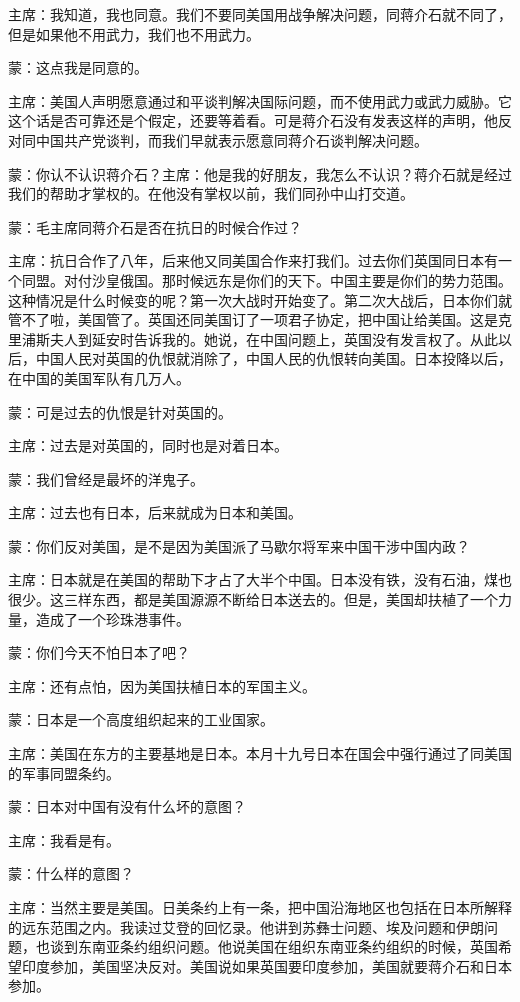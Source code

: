 主席：我知道，我也同意。我们不要同美国用战争解决问题，同蒋介石就不同了，但是如果他不用武力，我们也不用武力。

蒙：这点我是同意的。

主席：美国人声明愿意通过和平谈判解决国际问题，而不使用武力或武力威胁。它这个话是否可靠还是个假定，还要等着看。可是蒋介石没有发表这样的声明，他反对同中国共产党谈判，而我们早就表示愿意同蒋介石谈判解决问题。

蒙：你认不认识蒋介石？主席：他是我的好朋友，我怎么不认识？蒋介石就是经过我们的帮助才掌权的。在他没有掌权以前，我们同孙中山打交道。

蒙：毛主席同蒋介石是否在抗日的时候合作过？

主席：抗日合作了八年，后来他又同美国合作来打我们。过去你们英国同日本有一个同盟。对付沙皇俄国。那时候远东是你们的天下。中国主要是你们的势力范围。这种情况是什么时候变的呢？第一次大战时开始变了。第二次大战后，日本你们就管不了啦，美国管了。英国还同美国订了一项君子协定，把中国让给美国。这是克里浦斯夫人到延安时告诉我的。她说，在中国问题上，英国没有发言权了。从此以后，中国人民对英国的仇恨就消除了，中国人民的仇恨转向美国。日本投降以后，在中国的美国军队有几万人。

蒙：可是过去的仇恨是针对英国的。

主席：过去是对英国的，同时也是对着日本。

蒙：我们曾经是最坏的洋鬼子。

主席：过去也有日本，后来就成为日本和美国。

蒙：你们反对美国，是不是因为美国派了马歇尔将军来中国干涉中国内政？

主席：日本就是在美国的帮助下才占了大半个中国。日本没有铁，没有石油，煤也很少。这三样东西，都是美国源源不断给日本送去的。但是，美国却扶植了一个力量，造成了一个珍珠港事件。

蒙：你们今天不怕日本了吧？

主席：还有点怕，因为美国扶植日本的军国主义。

蒙：日本是一个高度组织起来的工业国家。

主席：美国在东方的主要基地是日本。本月十九号日本在国会中强行通过了同美国的军事同盟条约。

蒙：日本对中国有没有什么坏的意图？

主席：我看是有。

蒙：什么样的意图？

主席：当然主要是美国。日美条约上有一条，把中国沿海地区也包括在日本所解释的远东范围之内。我读过艾登的回忆录。他讲到苏彝士问题、埃及问题和伊朗问题，也谈到东南亚条约组织问题。他说美国在组织东南亚条约组织的时候，英国希望印度参加，美国坚决反对。美国说如果英国要印度参加，美国就要蒋介石和日本参加。

